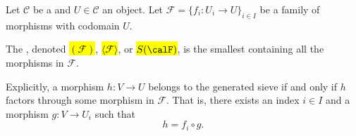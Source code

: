 \begin{definition} \label{definition:sieve_on_an_object_of_a_category_generated_by_a_family_of_morphisms}
Let $\mathcal{C}$ be a  and $U \in \mathcal{C}$ an object. Let $\mathcal{F} = \{f_i: U_i \to U\}_{i \in I}$ be a family of morphisms with codomain $U$. 

The , denoted \hl{$(\mathcal{F})$}, \hl{$\langle \mathcal{F} \rangle$}, or \hl{$S(\calF)$}, is the smallest  containing all the morphisms in $\mathcal{F}$.

Explicitly, a morphism $h: V \to U$ belongs to the generated sieve if and only if $h$ factors through some morphism in $\mathcal{F}$. That is, there exists an index $i \in I$ and a morphism $g: V \to U_i$ such that
$$ h = f_i \circ g. $$
\end{definition}
